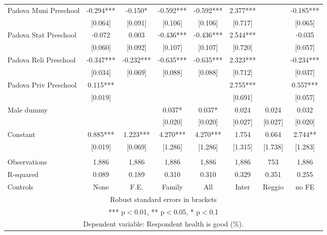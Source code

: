 \begin{tabular}{lccccccc}
Padova Muni Preschool & -0.294*** & -0.150* & -0.592*** & -0.592*** & 2.377*** &  & -0.185*** \\
 & [0.064] & [0.091] & [0.106] & [0.106] & [0.717] &  & [0.065] \\
Padova Stat Preschool & -0.072 & 0.003 & -0.436*** & -0.436*** & 2.544*** &  & -0.035 \\
 & [0.060] & [0.092] & [0.107] & [0.107] & [0.720] &  & [0.057] \\
Padova Reli Preschool & -0.347*** & -0.232*** & -0.635*** & -0.635*** & 2.323*** &  & -0.234*** \\
 & [0.034] & [0.069] & [0.088] & [0.088] & [0.712] &  & [0.037] \\
Padova Priv Preschool & 0.115*** &  &  &  & 2.755*** &  & 0.557*** \\
 & [0.019] &  &  &  & [0.691] &  & [0.057] \\
Male dummy &  &  & 0.037* & 0.037* & 0.024 & 0.024 & 0.032 \\
 &  &  & [0.020] & [0.020] & [0.027] & [0.027] & [0.020] \\
Constant & 0.885*** & 1.223*** & 4.270*** & 4.270*** & 1.754 & 0.664 & 2.744** \\
 & [0.019] & [0.069] & [1.286] & [1.286] & [1.315] & [1.738] & [1.283] \\
 &  &  &  &  &  &  &  \\
Observations & 1,886 & 1,886 & 1,886 & 1,886 & 1,886 & 753 & 1,886 \\
R-squared & 0.089 & 0.189 & 0.310 & 0.310 & 0.329 & 0.351 & 0.255 \\
 Controls & None & F.E. & Family & All & Inter & Reggio & no FE \\ \hline
\multicolumn{8}{c}{ Robust standard errors in brackets} \\
\multicolumn{8}{c}{ *** p$<$0.01, ** p$<$0.05, * p$<$0.1} \\
\multicolumn{8}{c}{ Dependent variable: Respondent health is good (\%).} \\
\end{tabular}
